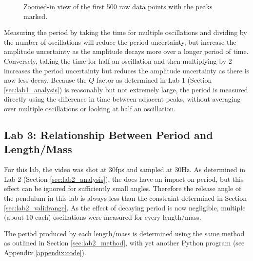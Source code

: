 \documentclass[aps,twocolumn,secnumarabic,nobalancelastpage,amsmath,amssymb,nofootinbib,floatfix,letterpaper]{revtex4}
\begin{document}
\begin{figure}[htb]
    \caption{Zoomed-in view of the first 500 raw data points with the peaks marked.}
    \label{fig:rawdata}
\end{figure}

Measuring the period by taking the time for multiple oscillations and dividing by the number of oscillations will reduce
the period uncertainty, but increase the amplitude uncertainty as the amplitude decays more over a longer period of
time. Conversely, taking the time for half an oscillation and then multiplying by 2 increases the period uncertainty but
reduces the amplitude uncertainty as there is now less decay. Because the \(Q\) factor as determined in Lab 1 (Section
\ref{sec:lab1_analysis}) is reasonably but not extremely large, the period is measured directly using the difference in
time between adjacent peaks, without averaging over multiple oscillations or looking at half an oscillation.

\subsection{Lab 3: Relationship Between Period and Length/Mass}

For this lab, the video was shot at 30fps and sampled at 30Hz. As determined in Lab 2 (Section \ref{sec:lab2_analysis}),
the does have an impact on period, but this effect can be ignored for sufficiently small angles. Therefore the release
angle of the pendulum in this lab is always less than the constraint determined in Section \ref{sec:lab2_validrange}.
As the effect of decaying period is now negligible, multiple (about 10 each) oscillations were measured for every
length/mass.

The period produced by each length/mass is determined using the same method as outlined in Section
\ref{sec:lab2_method}, with yet another Python program (see Appendix \ref{appendix:code}).
\end{document}
